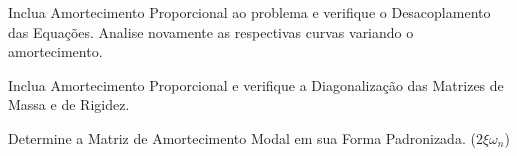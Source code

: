 \documentclass{article}
\begin{document}
\newpage\begin{exercise}\label{ex12}
    Inclua Amortecimento Proporcional ao problema e verifique o Desacoplamento das Equações. Analise novamente as respectivas curvas variando o amortecimento.
\end{exercise}
\begin{resolution}
    
\end{resolution}


\newpage\begin{exercise}\label{ex13}
    Inclua Amortecimento Proporcional e verifique a Diagonalização das Matrizes de Massa e de Rigidez.
\end{exercise}
\begin{resolution}
    
\end{resolution}


\newpage\begin{exercise}\label{ex14}
    Determine a Matriz de Amortecimento Modal em sua Forma Padronizada. ($2\xi\omega_n$)
\end{exercise}
\begin{resolution}
    
\end{resolution}
\end{document}
